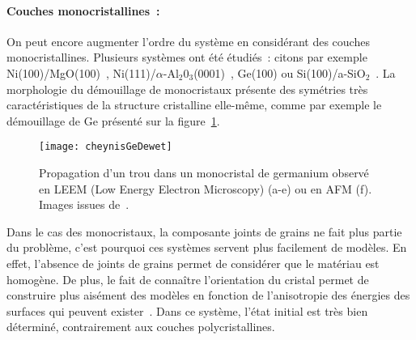 \paragraph*{Couches monocristallines~:} On peut encore augmenter l'ordre du système en considérant des couches monocristallines. Plusieurs systèmes ont été étudiés~: citons par exemple Ni(100)/MgO(100)~\cite{zucker2016mechanism}, Ni(111)/$\alpha$-Al$_2$0$_3$(0001)~\cite{rabkin2014solid}, Ge(100) ou Si(100)/a-SiO$_2$~\cite{leroy2013influence, cheynis2013dynamics}. La morphologie du démouillage de monocristaux présente des symétries très caractéristiques de la structure cristalline elle-même, comme par exemple le démouillage de Ge présenté sur la figure~\ref{cheynisGeDewet}.\par
\begin{figure}[!htb]
\centering
\texttt{[image: cheynisGeDewet]}
\caption{Propagation d'un trou dans un monocristal de germanium observé en LEEM (Low Energy Electron Microscopy) (a-e) ou en AFM (f). Images issues de~\cite{cheynis2013dynamics}.}
\label{cheynisGeDewet}
\end{figure}
Dans le cas des monocristaux, la composante \og joints de grains \fg{} ne fait plus partie du problème, c'est pourquoi ces systèmes servent plus facilement de modèles. En effet, l'absence de joints de grains permet de considérer que le matériau est homogène. De plus, le fait de connaître l'orientation du cristal permet de construire plus aisément des modèles en fonction de l'anisotropie des énergies des surfaces qui peuvent exister~\cite{zucker2013model}. Dans ce système, l'état initial est très bien déterminé, contrairement aux couches polycristallines.\par





